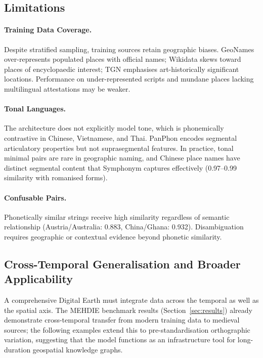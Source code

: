 \documentclass[11pt,a4paper]{article}
\begin{document}
\subsection{Limitations}
\label{subsec:limitations}

\paragraph{Training Data Coverage.} Despite stratified sampling, training sources retain geographic biases. GeoNames over-represents populated places with official names; Wikidata skews toward places of encyclopaedic interest; TGN emphasises art-historically significant locations. Performance on under-represented scripts and mundane places lacking multilingual attestations may be weaker.

\paragraph{Tonal Languages.} The architecture does not explicitly model tone, which is phonemically contrastive in Chinese, Vietnamese, and Thai. PanPhon encodes segmental articulatory properties but not suprasegmental features. In practice, tonal minimal pairs are rare in geographic naming, and Chinese place names have distinct segmental content that Symphonym captures effectively (0.97--0.99 similarity with romanised forms).

\paragraph{Confusable Pairs.} Phonetically similar strings receive high similarity regardless of semantic relationship (Austria/Australia: 0.883, China/Ghana: 0.932). Disambiguation requires geographic or contextual evidence beyond phonetic similarity.

\subsection{Cross-Temporal Generalisation and Broader Applicability}

A comprehensive Digital Earth must integrate data across the temporal as well as the spatial axis. The MEHDIE benchmark results (Section~\ref{sec:results}) already demonstrate cross-temporal transfer from modern training data to medieval sources; the following examples extend this to pre-standardisation orthographic variation, suggesting that the model functions as an infrastructure tool for long-duration geospatial knowledge graphs.
\end{document}
